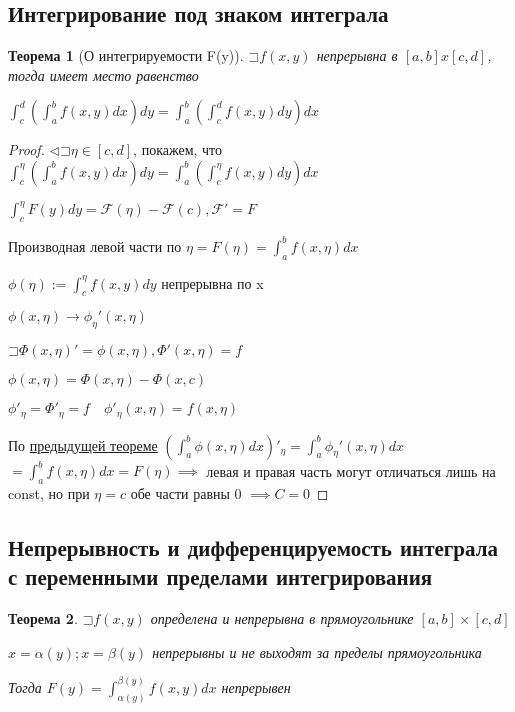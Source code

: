 \documentclass[a4paper]{article}
\newcommand\letsymbol{\mathord{\sqsupset}}
\newtheorem{theorem}{Теорема}[section]
\theoremstyle{definition}
\theoremstyle{remark}
\begin{document}
    \subsection{	Интегрирование под знаком интеграла}
    \begin{theorem}[О интегрируемости F(y)] 
     $\letsymbol{}f(x,y)$ непрерывна в $[a, b]x[c, d]$, тогда имеет место равенство

     $\int_c^d (\int_a^b f(x,y)dx)dy = \int_a^b (\int_c^d f(x,y)dy)dx$
\end{theorem}
\begin{proof}
     $\triangleleft \letsymbol{} \eta \in [c, d]$, покажем, что
$\int_c^\eta (\int_a^b f(x,y)dx)dy = \int_a^b (\int_c^\eta f(x,y)dy)dx$

$\int_c^\eta F(y)dy = \mathcal{F}(\eta) -  \mathcal{F}(c), \mathcal{F}' = F$

Производная левой части по $\eta = F(\eta) = \int_a^b f(x,\eta)dx$

$\phi (\eta) := \int_c^\eta f(x,y)dy$ непрерывна по x

$\phi (x, \eta) \rightarrow \phi_\eta'(x, \eta)$

$\letsymbol{} \Phi(x, \eta)'= \phi(x,\eta), \Phi'(x,\eta) = f$

$\phi(x,\eta) = \Phi(x,\eta) - \Phi(x, c)$

$\phi'_\eta = \Phi'_\eta  = f \quad \phi'_\eta(x, \eta) = f(x, \eta)$

По \hyperlink{theorem4}{предыдущей теореме}
$(\int_a^{b}\phi(x, \eta)dx)'_\eta = \int_a^b \phi_\eta'(x, \eta)dx$
$= \int_a^b f(x,\eta)dx = F(\eta)\implies$
левая и правая часть могут отличаться лишь на const, но при $\eta = c$
обе части равны 0 $\implies C = 0$
\end{proof}
    \subsection{	Непрерывность и дифференцируемость интеграла с переменными пределами интегрирования}
    \begin{theorem}
     $\letsymbol{} f(x,y)$ определена и непрерывна в прямоугольнике $[a, b]\times[c, d]$

     $x = \alpha(y); x = \beta(y)$ непрерывны и не выходят за пределы прямоугольника

     Тогда $F(y) = \int_{\alpha(y)}^{\beta(y)}f(x,y)dx$ непрерывен
\end{theorem}
\end{document}
